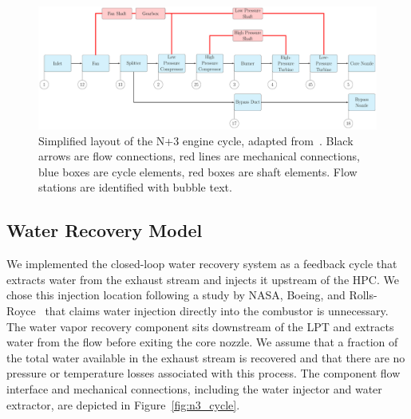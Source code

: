 \documentclass[conf]{new-aiaa}
\begin{document}
\begin{figure}[hbt!]
  \centering
  \includegraphics[width=1.0\textwidth]{N3_cycle.pdf}
  \caption{
    Simplified layout of the N+3 engine cycle, adapted from~\citet{Hendricks2019}.
    Black arrows are flow connections, red lines are mechanical connections, blue boxes are cycle elements, red boxes are shaft elements.
    Flow stations are identified with bubble text.
  }
  \label{fig:N3_original}
\end{figure}

\subsection{Water Recovery Model}
We implemented the closed-loop water recovery system as a feedback cycle that extracts water from the exhaust stream and injects it upstream of the HPC.
We chose this injection location following a study by NASA, Boeing, and Rolls-Royce~\cite{Daggett2010} that claims water injection directly into the combustor is unnecessary.
The water vapor recovery component sits downstream of the LPT and extracts water from the flow before exiting the core nozzle.
We assume that a fraction of the total water available in the exhaust stream is recovered and that there are no pressure or temperature losses associated with this process.
The component flow interface and mechanical connections, including the water injector and water extractor, are depicted in Figure~\ref{fig:n3_cycle}.
\end{document}

